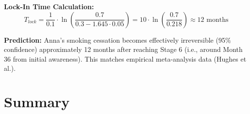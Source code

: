 \textbf{Lock-In Time Calculation:}
\begin{equation}
T_{lock} = \frac{1}{0.1} \cdot \ln\left(\frac{0.7}{0.3 - 1.645 \cdot 0.05}\right) = 10 \cdot \ln\left(\frac{0.7}{0.218}\right) \approx 12 \text{ months}
\end{equation}

\textbf{Prediction:} Anna's smoking cessation becomes effectively irreversible (95\% confidence) approximately 12 months after reaching Stage 6 (i.e., around Month 36 from initial awareness). This matches empirical meta-analysis data (Hughes et al.).



\section{Summary}
\label{sec:bcj-summary}

